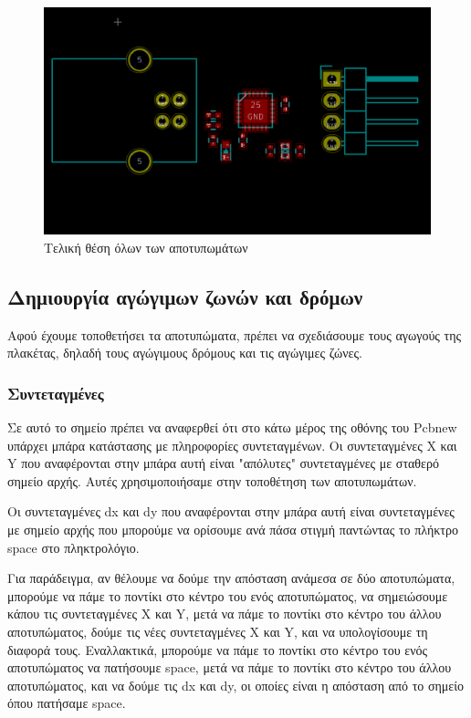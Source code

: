 \documentclass[a4paper]{article}
\begin{document}
 \begin{figure}
  \begin{center}
    \includegraphics[width=.9\textwidth]{img/pcb-circ-allmod.png}
    \caption{Τελική θέση όλων των αποτυπωμάτων}
    \label{fig:pcb-circ-allmod}
  \end{center}
\end{figure}


\subsection{Δημιουργία αγώγιμων ζωνών και δρόμων}
Αφού έχουμε τοποθετήσει τα αποτυπώματα, πρέπει να σχεδιάσουμε τους αγωγούς της πλακέτας, δηλαδή τους αγώγιμους δρόμους και τις αγώγιμες ζώνες.

\subsubsection{Συντεταγμένες}
Σε αυτό το σημείο πρέπει να αναφερθεί ότι στο κάτω μέρος της οθόνης του Pcbnew υπάρχει μπάρα κατάστασης με πληροφορίες συντεταγμένων. Οι συντεταγμένες X και Y που αναφέρονται στην μπάρα αυτή είναι "απόλυτες" συντεταγμένες με σταθερό σημείο αρχής. Αυτές χρησιμοποιήσαμε στην τοποθέτηση των αποτυπωμάτων. 

Οι συντεταγμένες dx και dy που αναφέρονται στην μπάρα αυτή είναι συντεταγμένες με σημείο αρχής που μπορούμε να ορίσουμε ανά πάσα στιγμή παντώντας το πλήκτρο space στο πληκτρολόγιο. 

Για παράδειγμα, αν θέλουμε να δούμε την απόσταση ανάμεσα σε δύο αποτυπώματα, μπορούμε να πάμε το ποντίκι στο κέντρο του ενός αποτυπώματος, να σημειώσουμε κάπου τις συντεταγμένες X και Y, μετά να πάμε το ποντίκι στο κέντρο του άλλου αποτυπώματος, δούμε τις νέες συντεταγμένες X και Y, και να υπολογίσουμε τη διαφορά τους. Εναλλακτικά, μπορούμε να πάμε το ποντίκι στο κέντρο του ενός αποτυπώματος να πατήσουμε space, μετά να πάμε το ποντίκι στο κέντρο του άλλου αποτυπώματος, και να δούμε τις dx και dy, οι οποίες είναι η απόσταση από το σημείο όπου πατήσαμε space.
\end{document}
